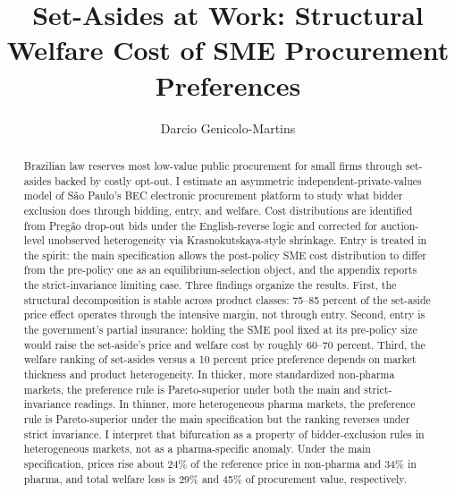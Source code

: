 \documentclass[12pt]{elsarticle}
\begin{document}
\begin{frontmatter}
\title{\textbf{Set-Asides at Work: Structural Welfare Cost of SME Procurement Preferences}}
\author[INSPER]{Darcio Genicolo-Martins}
\address[INSPER]{INSPER, S\~ao Paulo}

\begin{abstract}
Brazilian law reserves most low-value public procurement for small firms through set-asides backed by costly opt-out. I estimate an asymmetric independent-private-values model of S\~ao Paulo's BEC electronic procurement platform to study what bidder exclusion does through bidding, entry, and welfare. Cost distributions are identified from Preg\~ao drop-out bids under the English-reverse logic and corrected for auction-level unobserved heterogeneity via Krasnokutskaya-style shrinkage. Entry is treated in the \citet{atheyseira2011} spirit: the main specification allows the post-policy SME cost distribution to differ from the pre-policy one as an equilibrium-selection object, and the appendix reports the strict-invariance limiting case. Three findings organize the results. First, the structural decomposition is stable across product classes: 75--85 percent of the set-aside price effect operates through the intensive margin, not through entry. Second, entry is the government's partial insurance: holding the SME pool fixed at its pre-policy size would raise the set-aside's price and welfare cost by roughly 60--70 percent. Third, the welfare ranking of set-asides versus a 10 percent price preference depends on market thickness and product heterogeneity. In thicker, more standardized non-pharma markets, the preference rule is Pareto-superior under both the main and strict-invariance readings. In thinner, more heterogeneous pharma markets, the preference rule is Pareto-superior under the main specification but the ranking reverses under strict invariance. I interpret that bifurcation as a property of bidder-exclusion rules in heterogeneous markets, not as a pharma-specific anomaly. Under the main specification, prices rise about 24\% of the reference price in non-pharma and 34\% in pharma, and total welfare loss is 29\% and 45\% of procurement value, respectively.
\end{abstract}
\end{frontmatter}
\end{document}
